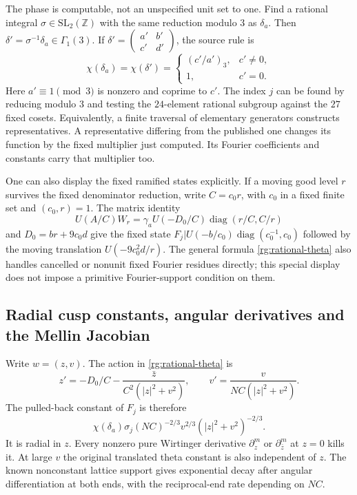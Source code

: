 The phase is computable, not an unspecified unit set to one.
Find a rational integral \(\sigma\in\mathrm{SL}_2(\mathbb Z)\)
with the same reduction modulo \(3\) as \(\delta_a\).
Then \(\delta'=\sigma^{-1}\delta_a\in\Gamma_1(3)\).
If \(\delta'=\left(\begin{smallmatrix}a'&b'\\c'&d'\end{smallmatrix}\right)\),
the source rule is
\begin{equation}\label{rg:kubota-rule}
 \chi(\delta_a)=\chi(\delta')=
 \begin{cases}
  (c'/a')_3,&c'\ne0,\\
  1,&c'=0 .
 \end{cases}
\end{equation}
Here \(a'\equiv1\pmod3\) is nonzero and coprime to \(c'\).
The index \(j\) can be found by reducing modulo \(3\) and testing the
\(24\)-element rational subgroup against the \(27\) fixed cosets.
Equivalently, a finite traversal of elementary generators constructs
representatives. A representative differing from the published one
changes its function by the fixed multiplier just computed.
Its Fourier coefficients and constants carry that multiplier too.

One can also display the fixed ramified states explicitly.
If a moving good level \(r\) survives the fixed denominator reduction,
write \(C=c_0r\), with \(c_0\) in a fixed finite set and
\((c_0,r)=1\). The matrix identity
\[
 U(A/C)W_r=\gamma_a U(-D_0/C)
                       \operatorname{diag}(r/C,C/r)
\]
and \(D_0=br+9c_0d\) give the fixed state
\(F_j|U(-b/c_0)\operatorname{diag}(c_0^{-1},c_0)\)
followed by the moving translation \(U(-9c_0^2d/r)\).
The general formula \eqref{rg:rational-theta} also handles cancelled
or nonunit fixed Fourier residues directly; this special display
does not impose a primitive Fourier-support condition on them.

\subsection{Radial cusp constants, angular derivatives and the Mellin Jacobian}
\label{rg:mellin-proof}
Write \(w=(z,v)\). The action in \eqref{rg:rational-theta} is
\begin{equation}\label{rg:cusp-action}
 z'=-D_0/C-\frac{\bar z}{C^2(|z|^2+v^2)},\qquad
 v'=\frac{v}{NC(|z|^2+v^2)} .
\end{equation}
The pulled-back constant of \(F_j\) is therefore
\begin{equation}\label{rg:pulled-constant}
 \chi(\delta_a)\sigma_j(NC)^{-2/3}
                  v^{2/3}(|z|^2+v^2)^{-2/3}.
\end{equation}
It is radial in \(z\). Every nonzero pure Wirtinger derivative
\(\partial_z^m\) or \(\partial_{\bar z}^m\) at \(z=0\) kills it.
At large \(v\) the original translated theta constant is also
independent of \(z\). The known nonconstant lattice support gives
exponential decay after angular differentiation at both ends,
with the reciprocal-end rate depending on \(NC\).

